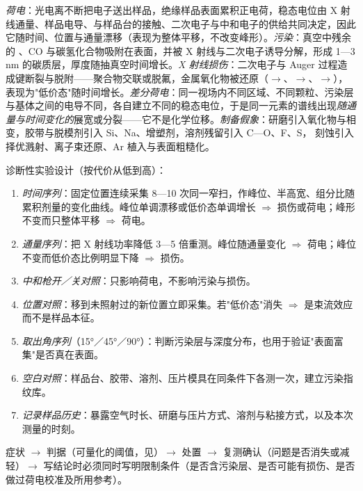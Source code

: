 \begin{principle}
\emph{荷电}：光电离不断把电子送出样品，绝缘样品表面累积正电荷，稳态电位由 X 射线通量、样品电导、与样品台的接触、二次电子与中和电子的供给共同决定，因此它随时间、位置与通量漂移（表现为整体平移，不改变峰形）。\emph{污染}：真空中残余的 、CO 与碳氢化合物吸附在表面，并被 X 射线与二次电子诱导分解，形成 1—3 nm 的碳质层，厚度随抽真空时间增长。\emph{X 射线损伤}：二次电子与 Auger 过程造成键断裂与脱附——聚合物交联或脱氟，金属氧化物被还原（$\to$、$\to$、$\to$），表现为"低价态"随时间增长。\emph{差分荷电}：同一视场内不同区域、不同颗粒、污染层与基体之间的电导不同，各自建立不同的稳态电位，于是同一元素的谱线出现\emph{随通量与时间变化的}展宽或分裂——它不是化学位移。\emph{制备假象}：研磨引入氧化物与相变，胶带与脱模剂引入 Si、Na、增塑剂，溶剂残留引入 C—O、F、S， 刻蚀引入择优溅射、离子束还原、Ar 植入与表面粗糙化。
\end{principle}

\begin{measure}
诊断性实验设计（按代价从低到高）：
\begin{enumerate}
\item \emph{时间序列}：固定位置连续采集 8—10 次同一窄扫，作峰位、半高宽、组分比随累积剂量的变化曲线。峰位单调漂移或低价态单调增长 $\Rightarrow$ 损伤或荷电；峰形不变而只整体平移 $\Rightarrow$ 荷电。
\item \emph{通量序列}：把 X 射线功率降低 3—5 倍重测。峰位随通量变化 $\Rightarrow$ 荷电；峰位不变而低价态比例明显下降 $\Rightarrow$ 损伤。
\item \emph{中和枪开／关对照}：只影响荷电，不影响污染与损伤。
\item \emph{位置对照}：移到未照射过的新位置立即采集。若"低价态"消失 $\Rightarrow$ 是束流效应而不是样品本征。
\item \emph{取出角序列}（15°／45°／90°）：判断污染层与深度分布，也用于验证"表面富集"是否真在表面。
\item \emph{空白对照}：样品台、胶带、溶剂、压片模具在同条件下各测一次，建立污染指纹库。
\item \emph{记录样品历史}：暴露空气时长、研磨与压片方式、溶剂与粘接方式，以及本次测量的时刻。
\end{enumerate}
\end{measure}

\begin{dataflow}
症状 $\to$ 判据（可量化的阈值，见）$\to$ 处置 $\to$ 复测确认（问题是否消失或减轻）$\to$ 写结论时必须同时写明限制条件（是否含污染层、是否可能有损伤、是否做过荷电校准及所用参考）。
\end{dataflow}

